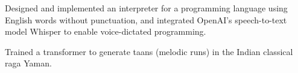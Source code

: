\documentclass[letterpaper,11pt]{hieudo-build}
\begin{document}
\newcommand{\smallsep}[0]{\vspace{0.2em}}

     
    \begin{tightemize}
        \item Designed and implemented an interpreter for a programming language using English words without punctuation, and integrated OpenAI's speech-to-text model Whisper to enable voice-dictated programming.
    \end{tightemize}

     
    \begin{tightemize}
        \item Trained a transformer to generate taans (melodic runs) in the Indian classical raga Yaman.
    \end{tightemize}


% 
\end{document}
